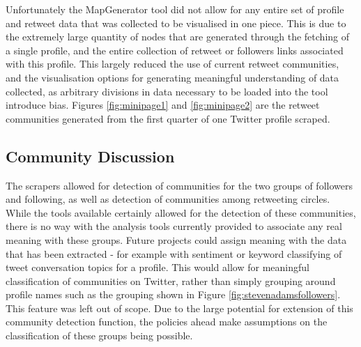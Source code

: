 Unfortunately the MapGenerator tool did not allow for any entire set of profile and retweet data that was collected to be visualised in one piece. This is due to the extremely large quantity of nodes that are generated through the fetching of a single profile, and the entire collection of retweet or followers links associated with this profile. This largely reduced the use of current retweet communities, and the visualisation options for generating meaningful understanding of data collected, as arbitrary divisions in data necessary to be loaded into the tool introduce bias. Figures \ref{fig:minipage1} and \ref{fig:minipage2} are the retweet communities generated from the first quarter of one Twitter profile scraped. 


\subsection{Community Discussion}

The scrapers allowed for detection of communities for the two groups of followers and following, as well as detection of communities among retweeting circles. While the tools available certainly allowed for the detection of these communities, there is no way with the analysis tools currently provided to associate any real meaning with these groups. Future projects could assign meaning with the data that has been extracted - for example with sentiment or keyword classifying of tweet conversation topics for a profile. This would allow for meaningful classification of communities on Twitter, rather than simply grouping around profile names such as the grouping shown in Figure \ref{fig:stevenadamsfollowers}. This feature was left out of scope. Due to the large potential for extension of this community detection function, the policies ahead make assumptions on the classification of these groups being possible. 




